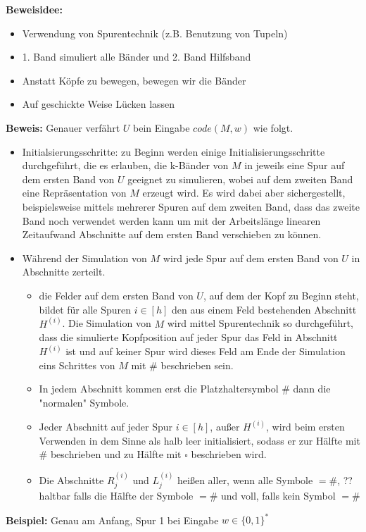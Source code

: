 \begin{satz}{}
    \textbf{Beweisidee:}
    \begin{itemize}[noitemsep]
        \item Verwendung von Spurentechnik (z.B. Benutzung von Tupeln)
        \item 1. Band simuliert alle Bänder und 2. Band Hilfsband
        \item Anstatt Köpfe zu bewegen, bewegen wir die Bänder
        \item Auf geschickte Weise Lücken lassen
    \end{itemize}
    \textbf{Beweis:} Genauer verfährt $U$ bein Eingabe $code(M, w)$ wie folgt.
    \begin{itemize}
        \item Initialsierungsschritte: zu Beginn werden einige Initialisierungsschritte durchgeführt, die es erlauben, die k-Bänder von $M$ in jeweils eine Spur auf dem ersten Band von $U$ geeignet zu simulieren, wobei auf dem zweiten Band eine Repräsentation von $M$ erzeugt wird. Es wird dabei aber sichergestellt, beispielsweise mittels mehrerer Spuren auf dem zweiten Band, dass das zweite Band noch verwendet werden kann um mit der Arbeitslänge linearen Zeitaufwand Abschnitte auf dem ersten Band verschieben zu können.
        \item Während der Simulation von $M$ wird jede Spur auf dem ersten Band von $U$ in Abschnitte zerteilt.
        \begin{itemize}
            \item die Felder auf dem ersten Band von $U$, auf dem der Kopf zu Beginn steht, bildet für alle Spuren $i \in [h]$ den aus einem Feld bestehenden Abschnitt $H^{(i)}$. Die Simulation von $M$ wird mittel Spurentechnik so durchgeführt, dass die simulierte Kopfposition auf jeder Spur das Feld in Abschnitt $H^{(i)}$ ist und auf keiner Spur wird dieses Feld am Ende der Simulation eins Schrittes von $M$ mit $\#$ beschrieben sein.
            \item In jedem Abschnitt kommen erst die Platzhaltersymbol $\#$ dann die "normalen" Symbole.
            \item Jeder Abschnitt auf jeder Spur $i \in [h]$, außer $H^{(i)}$, wird beim ersten Verwenden in dem Sinne als halb leer initialisiert, sodass er zur Hälfte mit $\#$ beschrieben und zu Hälfte mit $\square$ beschrieben wird.
            \item Die Abschnitte $R_j^{(i)}$ und $L_j^{(i)}$ heißen aller, wenn alle Symbole $= \#$, ??haltbar falls die Hälfte der Symbole $= \#$ und voll, falls kein Symbol $= \#$
        \end{itemize}
    \end{itemize}
    \textbf{Beispiel:} Genau am Anfang, Spur 1 bei Eingabe $w \in \{0, 1\}^*$
    

\end{satz}
